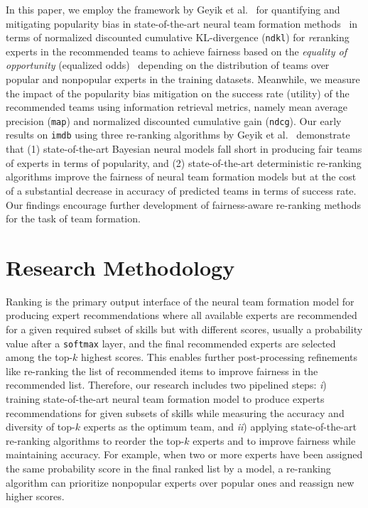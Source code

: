 \documentclass[runningheads]{llncs}
\begin{document}
In this paper, we employ the framework by Geyik et al.~\cite{DBLP:conf/kdd/GeyikAK19} for quantifying and mitigating popularity bias in state-of-the-art neural team formation methods~\cite{DBLP:conf/cikm/DashtiSF22} in terms of normalized discounted cumulative KL-divergence (\texttt{ndkl}) for \textit{re}ranking experts in the recommended teams to achieve fairness based on the \textit{equality of opportunity} (equalized odds)~\cite{hardt2016equality} depending on the distribution of teams over popular and nonpopular experts in the training datasets. Meanwhile, we measure the impact of the popularity bias mitigation on the success rate (utility) of the recommended teams using information retrieval metrics, namely mean average precision (\texttt{map}) and normalized discounted cumulative gain (\texttt{ndcg}). Our early results on \texttt{imdb} using three re-ranking algorithms by Geyik et al.~\cite{DBLP:conf/kdd/GeyikAK19} demonstrate that (1) state-of-the-art Bayesian neural models fall short in producing fair teams of experts in terms of popularity, and (2) state-of-the-art deterministic re-ranking algorithms improve the fairness of neural team formation models but at the cost of a substantial decrease in accuracy of predicted teams in terms of success rate. Our findings encourage further development of fairness-aware re-ranking methods for the task of team formation.

\section{Research Methodology}
Ranking is the primary output interface of the neural team formation model for producing expert recommendations where all available experts are recommended for a given required subset of skills but with different scores, usually a probability value after a \texttt{softmax} layer, and the final recommended experts are selected among the top-$k$ highest scores. This enables further post-processing refinements like re-ranking the list of recommended items to improve fairness in the recommended list. Therefore, our research includes two pipelined steps: \textit{i}) training state-of-the-art neural team formation model to produce experts recommendations for given subsets of skills while measuring the accuracy and diversity of top-$k$ experts as the optimum team, and \textit{ii}) applying state-of-the-art re-ranking algorithms to reorder the top-$k$ experts and to improve fairness while maintaining accuracy. For example, when two or more experts have been assigned the same probability score in the final ranked list by a model, a re-ranking algorithm can prioritize nonpopular experts over popular ones and reassign new higher scores. 
\end{document}
